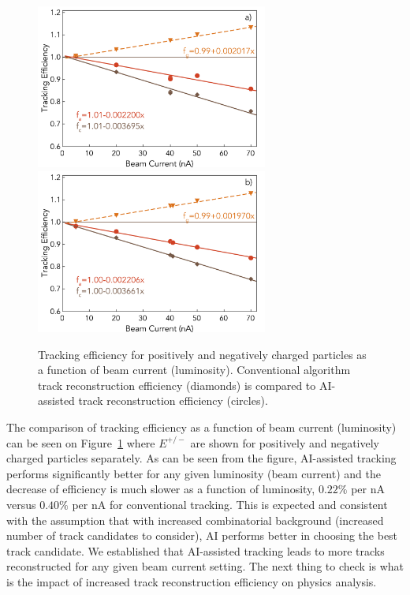  \begin{figure}[!ht]
\begin{center}
 \includegraphics[width=3.0in]{images/figure_lscan_pos.pdf}
 \includegraphics[width=3.0in]{images/figure_lscan_neg.pdf}
\caption {Tracking efficiency for positively and negatively charged particles as a function of beam current (luminosity).  Conventional algorithm 
track reconstruction efficiency (diamonds) is compared to AI-assisted track reconstruction efficiency (circles). }
 \label{lumi:scan}
 \end{center}
\end{figure}

The comparison of tracking efficiency as a function of beam current (luminosity) can be seen on Figure~\ref{lumi:scan} where $E^{+/-}$ are shown for positively and negatively charged particles separately. As can be seen from the figure, AI-assisted tracking performs significantly better for any given luminosity (beam current) and the decrease of efficiency is much slower as a function of luminosity, $0.22\%$ per nA versus $0.40\%$ per nA for conventional tracking. This is expected and consistent with the assumption that with increased combinatorial background (increased number of track candidates to consider), AI performs better in choosing the best track candidate. We established that AI-assisted
tracking leads to more tracks reconstructed for any given beam current setting. The next thing to check is what is the impact of increased track reconstruction efficiency on physics analysis.

